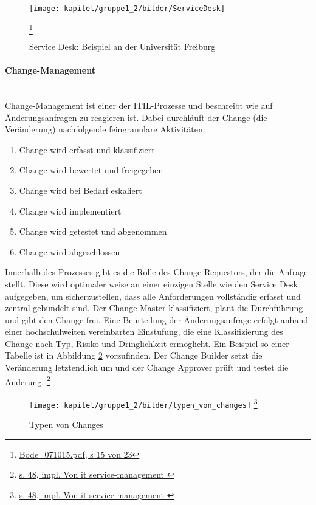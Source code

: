 \begin{figure}[h!]
	\centering
	\texttt{[image: kapitel/gruppe1\_2/bilder/ServiceDesk]}
	\caption{Service Desk: Beispiel an der Universität Freiburg}  \footnote{\url{Bode_071015.pdf, s 15 von 23}}
	\label{fig_service_desk}
\end{figure}

 

\paragraph{Change-Management}\mbox{}\\
Change-Management ist einer der ITIL-Prozesse und beschreibt wie auf Änderungsanfragen zu reagieren ist. Dabei durchläuft der Change (die Veränderung) nachfolgende feingranulare Aktivitäten:

\begin{enumerate}
    \item Change wird erfasst und klassifiziert
    \item Change wird bewertet und freigegeben
    \item Change wird bei Bedarf eskaliert
    \item Change wird implementiert
    \item Change wird getestet und abgenommen
    \item Change wird abgeschlossen
\end{enumerate}

Innerhalb des Prozesses gibt es die Rolle des Change Requestors, der die Anfrage stellt. Diese wird optimaler weise an einer einzigen Stelle wie den Service Desk aufgegeben, um sicherzustellen, dass alle Anforderungen vollständig erfasst und zentral gebündelt sind. Der Change Master klassifiziert, plant die Durchführung und gibt den Change frei. Eine Beurteilung der Änderungsanfrage erfolgt anhand einer hochschulweiten vereinbarten Einstufung, die eine Klassifizierung des Change nach Typ, Risiko und Dringlichkeit ermöglicht. Ein Beispiel so einer Tabelle ist in Abbildung \ref{fig_typenvonchange} vorzufinden. Der Change Builder setzt die Veränderung letztendlich um und der Change Approver prüft und testet die Änderung. \footnote{\url{s. 48, impl. Von it service-management }}
 
\begin{figure}[h!]
	\centering
	\texttt{[image: kapitel/gruppe1\_2/bilder/typen\_von\_changes]} 
	\footnote{\url{s. 48, impl. Von it service-management }}
	\caption{Typen von Changes}
	\label{fig_typenvonchange}
\end{figure}




